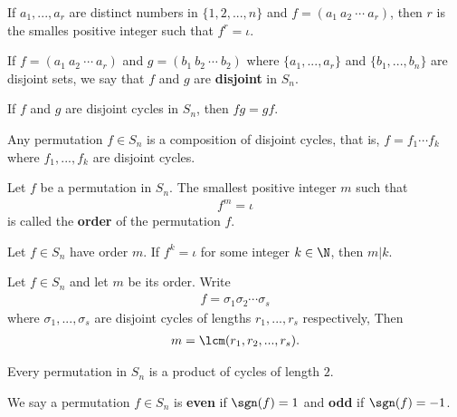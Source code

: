 \documentclass{article}
\begin{document}
\begin{corollary}
	If $a_1, ..., a_r$ are distinct numbers in $\{1,2,...,n\}$ and $f=(a_1\: a_2\: \cdots \: a_r)$, then $r$ is the smalles positive integer such that $f^r=\iota$.
\end{corollary}
\begin{definition}
	If $f=(a_1\:a_2\:\cdots\: a_r)$ and $g=(b_1\:b_2\:\cdots\:b_2)$ where $\{a_1,...,a_r\}$ and $\{b_1,..., b_n\}$ are disjoint sets, we say that $f$ and $g$ are \textbf{disjoint} in $S_n$.
\end{definition}
\begin{proposition}
	If $f$ and $g$ are disjoint cycles in $S_n$, then $fg=gf$.
\end{proposition}
\begin{theorem}
	Any permutation $f\in S_n$ is a composition of disjoint cycles, that is, $f=f_1\cdots f_k$ where $f_1,...,f_k$ are disjoint cycles.
\end{theorem}
\begin{definition}
	Let $f$ be a permutation in $S_n$. The smallest positive integer $m$ such that
	\begin{align*}
		f^m = \iota
	\end{align*}
	is called the \textbf{order} of the permutation $f$.
\end{definition}
\begin{lemma}
	Let $f\in S_n$ have order $m$. If $f^k=\iota$ for some integer $k\in\N$, then $m|k$.
\end{lemma}
\begin{lemma}
	Let $f\in S_n$ and let $m$ be its order. Write
	\begin{align*}
		f=\sigma_1\sigma_2\cdots \sigma_s
	\end{align*}
	where $\sigma_1,...,\sigma_s$ are disjoint cycles of lengths $r_1, ..., r_s$ respectively, Then
	\begin{align*}
		m=\lcm(r_1,r_2,...,r_s).
	\end{align*}
\end{lemma}
\begin{lemma}
	Every permutation in $S_n$ is a product of cycles of length $2$.
\end{lemma}
\begin{definition}
	We say a permutation $f\in S_n$ is \textbf{even} if $\sgn(f)=1$ and \textbf{odd} if $\sgn(f) = -1$.
\end{definition}
\end{document}
